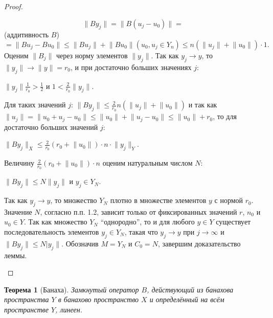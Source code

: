 \documentclass[12pt,a4paper,titlepage,oneside]{book}
\theoremstyle{definition}
\theoremstyle{plain}
\newtheorem*{theorem}{Теорема}
\theoremstyle{break}
\theoremstyle{remark}
\theoremstyle{remark}
\theoremstyle{remark}
\theoremstyle{remark}
\theoremstyle{plain}
\theoremstyle{plain}
\begin{document}
\begin{proof}
\begin{enumerate}
$$\lVert By_j\rVert = \lVert B(u_j - u_0)\rVert =$$ (аддитивность $B$) 
$$ = \lVert Bu_j - Bu_0\rVert \leqslant \lVert Bu_j\rVert + \lVert Bu_0\rVert(u_0, u_j \in Y_n) \leqslant n(\lVert u_j\rVert + \lVert u_0\rVert)\cdot 1.$$
Оценим $\lVert B_j\rVert$ через норму элементов $\lVert y_j\rVert$. Так как $y_j \to y$, то $\lVert y_j\rVert \to \lVert y\rVert=r_0$, и при достаточно больших значениях $j$:

\begin{center}
$\lVert y_j\rVert\frac{1}{r_0}>\frac12$ и $1<\frac{2}{r_0}\lVert y_j\rVert$.
\end{center}

Для таких значений $j$: $\lVert By_j\rVert\le\frac{2}{r_0}n(\lVert u_j\rVert + \lVert u_0\rVert)$ и так как $\lVert u_j\rVert = \lVert u_0 + u_j - u_0\rVert \leqslant \lVert u_0\rVert + \lVert u_j - u_0\rVert \leqslant \lVert u_0\rVert + r_0$, то для достаточно больших значений $j$:

\begin{center}
$\lVert By_j\rVert_X \leqslant \frac{2}{r_0}(r_0 + \lVert u_0\rVert)\cdot n\cdot \lVert y_j\rVert_Y$.
\end{center}

Величину $\frac{2}{r_0}(r_0 + \lVert u_0\rVert)\cdot n$ оценим натуральным числом $N$:

\begin{center}
$\lVert By_j\rVert \leqslant N\lVert y_j\rVert$ и $y_j \in Y_N$.
\end{center}

Так как $y_j \to y$, то множество $Y_N$ плотно в множестве элементов $y$ с нормой $r_0$. Значение $N$, согласно п.п. 1.2, зависит только от фиксированных значений $r$, $n_0$ и $u_0 \in Y$. Так как множество $Y_N$ ``однородно'', то и для любого $y \in Y$ существует последовательность элементов $y_j \in Y_N$, такая что $y_j \to y$ при $j \to \infty$ и $\lVert By_j\rVert \leqslant N\lvert y_j\rVert$. Обозначив $M = Y_N$ и $C_0 = N$, завершим доказательство леммы.
\qedhere
\end{enumerate}
\end{proof}

\begin{theorem}[Банаха]
Замкнутый оператор $B$, действующий из банахова пространства $Y$ в банахово пространство $X$ и определённый на всём пространстве $Y$, линеен.
\end{theorem}
\end{document}
